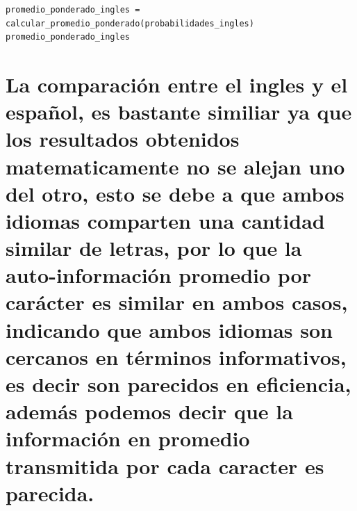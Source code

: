 \documentclass[
  11pt,
  letterpaper,
  answers
]{exam}
\begin{document}
\begin{questions}
\begin{solution}
\begin{parts}
\begin{verbatim}
promedio_ponderado_ingles = calcular_promedio_ponderado(probabilidades_ingles)
promedio_ponderado_ingles
\end{verbatim}

\part{La comparación entre el ingles y el español, es bastante similiar ya que los resultados obtenidos matematicamente no se alejan uno del otro, esto se debe a que ambos idiomas comparten una cantidad similar de letras, por lo que la auto-información promedio por carácter es similar en ambos casos, indicando que ambos idiomas son cercanos en términos informativos, es decir son parecidos en eficiencia, además podemos decir que la información en promedio transmitida por cada caracter es parecida.}
\end{parts}
\end{solution}


















\end{questions}
\end{document}
